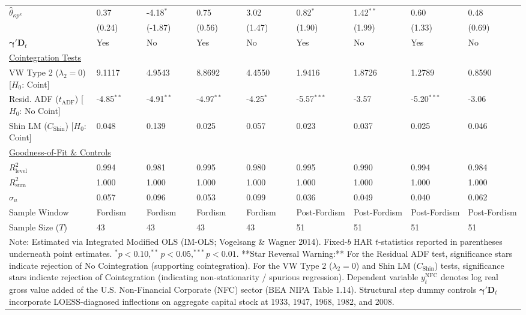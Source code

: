 \begin{landscape}
\begin{table}[H]
\begin{tabular}{p{5.0cm}p{1.5cm}p{1.5cm}p{1.5cm}p{1.5cm}p{1.5cm}p{1.5cm}p{1.5cm}p{1.5cm}}
$\hat{\theta}_{\kappa p^{\kappa}}$ & 0.37 & -4.18$^{*}$ & 0.75 & 3.02 & 0.82$^{*}$ & 1.42$^{**}$ & 0.60 & 0.48  \\
 & {\scriptsize (0.24)} & {\scriptsize (-1.87)} & {\scriptsize (0.56)} & {\scriptsize (1.47)} & {\scriptsize (1.90)} & {\scriptsize (1.99)} & {\scriptsize (1.33)} & {\scriptsize (0.69)}  \\
$\boldsymbol{\gamma}' \mathbf{D}_t$ & Yes & No & Yes & No & Yes & No & Yes & No  \\
\midrule
\multicolumn{9}{l}{\underline{Cointegration Tests}} \\
VW Type 2 ($\lambda_2 = 0$) [$H_0$: Coint] & 9.1117 & 4.9543 & 8.8692 & 4.4550 & 1.9416 & 1.8726 & 1.2789 & 0.8590  \\
Resid. ADF ($t_{\text{ADF}}$) [$H_0$: No Coint] & -4.85$^{**}$ & -4.91$^{**}$ & -4.97$^{**}$ & -4.25$^{*}$ & -5.57$^{***}$ & -3.57 & -5.20$^{***}$ & -3.06  \\
Shin LM ($C_{\text{Shin}}$) [$H_0$: Coint] & 0.048 & 0.139 & 0.025 & 0.057 & 0.023 & 0.037 & 0.025 & 0.046  \\
\midrule
\multicolumn{9}{l}{\underline{Goodness-of-Fit \& Controls}} \\
$R_{\text{level}}^2$ & 0.994 & 0.981 & 0.995 & 0.980 & 0.995 & 0.990 & 0.994 & 0.984  \\
$R_{\text{sum}}^2$ & 1.000 & 1.000 & 1.000 & 1.000 & 1.000 & 1.000 & 1.000 & 1.000  \\
$\hat{\sigma}_u$ & 0.057 & 0.096 & 0.053 & 0.099 & 0.036 & 0.049 & 0.040 & 0.062  \\
Sample Window & Fordism & Fordism & Fordism & Fordism & Post-Fordism & Post-Fordism & Post-Fordism & Post-Fordism  \\
Sample Size ($T$) & 43 & 43 & 43 & 43 & 51 & 51 & 51 & 51  \\
\bottomrule
\multicolumn{9}{p{19.5cm}}{\footnotesize Note: Estimated via Integrated Modified OLS (IM-OLS; Vogelsang \& Wagner 2014). Fixed-$b$ HAR $t$-statistics reported in parentheses underneath point estimates. $^*p<0.10, ^{**}p<0.05, ^{***}p<0.01$. **Star Reversal Warning:** For the Residual ADF test, significance stars indicate rejection of No Cointegration (supporting cointegration). For the VW Type 2 ($\lambda_2 = 0$) and Shin LM ($C_{\text{Shin}}$) tests, significance stars indicate rejection of Cointegration (indicating non-stationarity / spurious regression). Dependent variable $y_t^{\text{NFC}}$ denotes log real gross value added of the U.S. Non-Financial Corporate (NFC) sector (BEA NIPA Table 1.14). Structural step dummy controls $\boldsymbol{\gamma}' \mathbf{D}_t$ incorporate LOESS-diagnosed inflections on aggregate capital stock at 1933, 1947, 1968, 1982, and 2008.}
\end{tabular}
\end{table}
\end{landscape}
